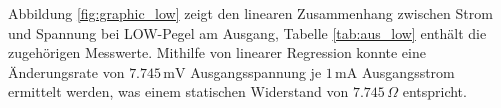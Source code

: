 
Abbildung \ref{fig:graphic_low} zeigt den linearen Zusammenhang zwischen
Strom und Spannung bei LOW-Pegel am Ausgang, Tabelle \ref{tab:aus_low} enthält
die zugehörigen Messwerte. Mithilfe von linearer Regression
konnte eine Änderungsrate von $7.745 \, \si{\milli\volt}$ Ausgangsspannung je $1
\, \si{\milli\ampere}$ Ausgangsstrom ermittelt werden, was einem
statischen Widerstand von $7.745 \, \Omega$ entspricht.